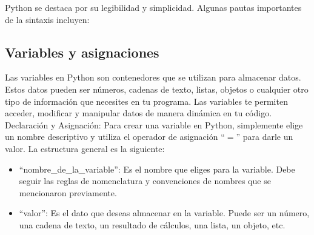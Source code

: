 Python se destaca por su legibilidad y simplicidad. Algunas pautas importantes de la sintaxis incluyen:

\subsection{Variables y asignaciones}
Las variables en Python son contenedores que se utilizan para almacenar datos. Estos datos pueden ser números, cadenas de texto, listas, objetos o cualquier otro tipo de información que necesites en tu programa. Las variables te permiten acceder, modificar y manipular datos de manera dinámica en tu código.\\

Declaración y Asignación: Para crear una variable en Python, simplemente elige un nombre descriptivo y utiliza el operador de asignación ``$=$'' para darle un valor. La estructura general es la siguiente:

\begin{figure}[h]
    \centering
  \end{figure}

\begin{itemize}
    \item ``nombre\_de\_la\_variable'': Es el nombre que eliges para la variable. Debe seguir las reglas de nomenclatura y convenciones de nombres que se mencionaron previamente.  
    \item ``valor'': Es el dato que deseas almacenar en la variable. Puede ser un número, una cadena de texto, un resultado de cálculos, una lista, un objeto, etc.
\end{itemize}

\begin{figure}[h]
    \centering
  \end{figure}

